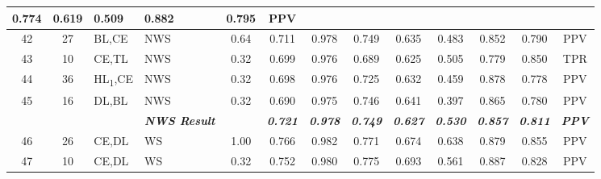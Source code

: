 \begin{table}[H]
{\begin{tabular}{ccl|l|c|c|c|c|c|c|c|c|c|}
    0.774 &
    0.619 &
    0.509 &
    0.882 &
    0.795 &
    PPV \\ \hline
  \multicolumn{1}{|c|}{42} &
    \multicolumn{1}{c|}{27} &
    BL,CE &
    NWS &
    0.64 &
    0.711 &
    0.978 &
    0.749 &
    0.635 &
    0.483 &
    0.852 &
    0.790 &
    PPV \\ \hline
  \multicolumn{1}{|c|}{43} &
    \multicolumn{1}{c|}{10} &
    CE,TL &
    NWS &
    0.32 &
    0.699 &
    0.976 &
    0.689 &
    0.625 &
    0.505 &
    0.779 &
    0.850 &
    TPR \\ \hline
  \multicolumn{1}{|c|}{44} &
    \multicolumn{1}{c|}{36} &
    HL\textsubscript{1},CE &
    NWS &
    0.32 &
    0.698 &
    0.976 &
    0.725 &
    0.632 &
    0.459 &
    0.878 &
    0.778 &
    PPV \\ \hline
  \multicolumn{1}{|c|}{45} &
    \multicolumn{1}{c|}{16} &
    DL,BL &
    NWS &
    0.32 &
    0.690 &
    0.975 &
    0.746 &
    0.641 &
    0.397 &
    0.865 &
    0.780 &
    PPV \\ \hline
   &
    \textit{\textbf{}} &
     &
    \textit{\textbf{NWS Result}} &
     &
    \textit{\textbf{0.721}} &
    \textit{\textbf{0.978}} &
    \textit{\textbf{0.749}} &
    \textit{\textbf{0.627}} &
    \textit{\textbf{0.530}} &
    \textit{\textbf{0.857}} &
    \textit{\textbf{0.811}} &
    \textit{\textbf{PPV}} \\ \hline
  \multicolumn{1}{|c|}{46} &
    \multicolumn{1}{c|}{26} &
    CE,DL &
    WS &
    1.00 &
    0.766 &
    0.982 &
    0.771 &
    0.674 &
    0.638 &
    0.879 &
    0.855 &
    PPV \\ \hline
  \multicolumn{1}{|c|}{47} &
    \multicolumn{1}{c|}{10} &
    CE,DL &
    WS &
    0.32 &
    0.752 &
    0.980 &
    0.775 &
    0.693 &
    0.561 &
    0.887 &
    0.828 &
    PPV \\ \hline
  \end{tabular}%
  }
  \end{table}

